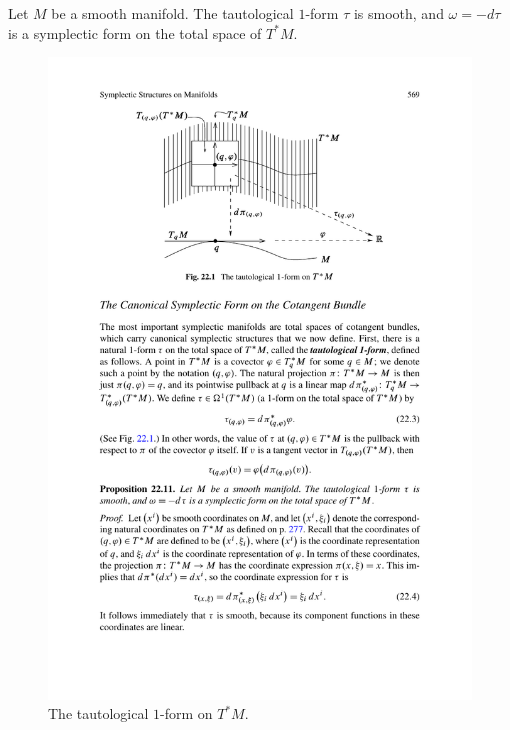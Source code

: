 \begin{proposition}\label{tautological form symplectic}
Let $M$ be a smooth manifold. The tautological $1$-form $\tau$ is smooth, and $\omega=-d\tau$ is a symplectic form on the total space of $T^*M$.
\end{proposition}
\begin{figure}[htbp]
\centering
\includegraphics{pictures/tautological-form}
\caption{The tautological $1$-form on $T^*M$.}
\end{figure}
